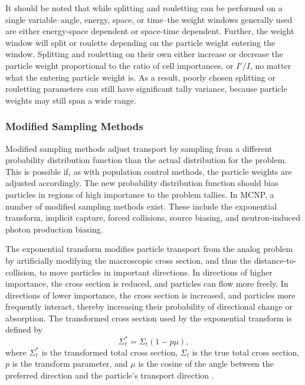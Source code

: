 It should be noted that
while splitting and rouletting can be performed on a single variable--angle,
energy, space, or time--the weight windows generally used are either energy-space
dependent or space-time dependent. Further, the weight window will split or
roulette depending on the particle weight entering the window. Splitting and
rouletting on their own either increase or decrease the particle weight
proportional to the ratio of cell importances, or $I'/I$, no matter what
the entering particle weight is. As a
result, poorly chosen splitting or rouletting parameters can still
have significant tally variance, because particle weights may still span a wide
range.

\subsubsection*{Modified Sampling Methods}

Modified sampling methods adjust transport by sampling from a different probability
distribution function than the actual distribution for the problem. This is
possible if, as with population control methods, the particle weights are adjusted
 accordingly.
 The new probability distribution function should bias particles in regions of high
 importance to the problem tallies. In MCNP, a number of modified sampling
 methods exist.
 These include the exponential transform, implicit capture, forced collisions, source
 biasing, and neutron-induced photon production biasing.

The exponential transform modifies particle transport from the analog problem by
artificially modifying the macroscopic cross section, and thus the
distance-to-collision, to move particles in important directions. In directions
of higher importance, the cross section is reduced, and particles can flow more
freely. In directions of lower importance, the cross section is increased, and
particles more frequently interact, thereby increasing their probability of
directional change or absorption. The transformed cross section used by the
exponential transform is defined by
%
\begin{equation}
  \Sigma_t^* = \Sigma_t(1-p\mu) ,
  \label{eq:ExTrns}
\end{equation}
%
where $\Sigma_t^*$ is the transformed total cross section, $\Sigma_t$ is the
true total cross section, $p$ is the transform parameter, and $\mu$ is the
cosine of the angle between the preferred direction and the particle's transport
direction \cite{mcnp_manual_v1, mcnp_manual_v2, hendricks_mcnp_1985}.

